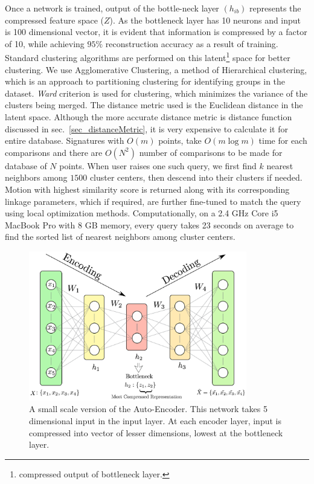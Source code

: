 \documentclass[twocolumn,10pt]{asme2ej}
\begin{document}
Once a network is trained, output of the bottle-neck layer $(h_{ib})$ represents the compressed feature space ($Z$).
As the bottleneck layer has 10 neurons and input is 100 dimensional vector, it is evident that information is compressed by a factor of 10, while achieving $95\%$ reconstruction accuracy as a result of training.
Standard clustering algorithms are performed on this latent\footnote{compressed output of bottleneck layer.} space for better clustering\cite{song2013}.
We use Agglomerative Clustering, a method of Hierarchical clustering, which is an approach to partitioning clustering for identifying groups in the dataset.
\emph{Ward}\cite{ward1963} criterion is used for clustering, which minimizes the variance of the clusters being merged.
The distance metric used is the Euclidean distance in the latent space.
Although the more accurate distance metric is distance function discussed in sec.~\ref{sec_distanceMetric}, it is very expensive to calculate it for entire database.
Signatures with ${O}(m)$ points, take ${O}(m\log{}m)$ time for each comparisons and there are ${O}(N^2)$ number of comparisons to be made for database of $N$ points.
When user raises one such query, we first find $k$ nearest neighbors among $1500$ cluster centers, then descend into their clusters if needed.
Motion with highest similarity score is returned along with its corresponding linkage parameters, which if required, are further fine-tuned to match the query using local optimization methods. Computationally, on a 2.4 GHz Core i5 MacBook Pro with 8 GB memory, every query takes 23 seconds on average to find the sorted list of nearest neighbors among cluster centers.

\begin{figure}
\centering
\includegraphics[width=270pt]{figure/fig_auto_encoder.eps}
  \caption{A small scale version of the Auto-Encoder. This network takes 5 dimensional input in the input layer. At each encoder layer, input is compressed into vector of lesser dimensions, lowest at the bottleneck layer.}
\label{autoEncoder}
\end{figure}
\end{document}
